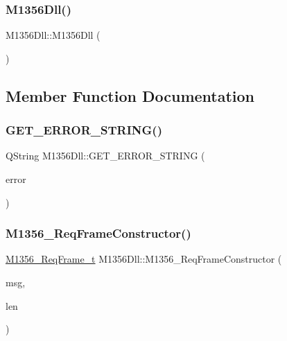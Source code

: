 \subsubsection{\texorpdfstring{M1356Dll()}{M1356Dll()}}
{\footnotesize\ttfamily M1356\+Dll\+::\+M1356\+Dll (\begin{DoxyParamCaption}{ }\end{DoxyParamCaption})}



\subsection{Member Function Documentation}
\mbox{\label{class_m1356_dll_ad35a73433e99eb6ccce5f3729f7ae283}} 
\subsubsection{\texorpdfstring{GET\_ERROR\_STRING()}{GET\_ERROR\_STRING()}}
{\footnotesize\ttfamily Q\+String M1356\+Dll\+::\+G\+E\+T\+\_\+\+E\+R\+R\+O\+R\+\_\+\+S\+T\+R\+I\+NG (\begin{DoxyParamCaption}\item[{Q\+String}]{error }\end{DoxyParamCaption})}

\mbox{\label{class_m1356_dll_a44099cd5f4bbdf9f37507eb7fa5477d6}} 
\subsubsection{\texorpdfstring{M1356\_ReqFrameConstructor()}{M1356\_ReqFrameConstructor()}}
{\footnotesize\ttfamily \mbox{\hyperlink{struct_m1356___req_frame__t}{M1356\+\_\+\+Req\+Frame\+\_\+t}} M1356\+Dll\+::\+M1356\+\_\+\+Req\+Frame\+Constructor (\begin{DoxyParamCaption}\item[{const char $\ast$}]{msg,  }\item[{int}]{len }\end{DoxyParamCaption})}

\mbox{\label{class_m1356_dll_a40131e8263bd201208a37ec1826d5310}} 
